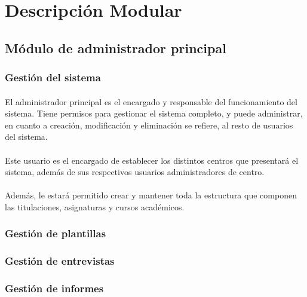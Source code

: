 \section{Descripción Modular}\label{descMod}

   \subsection{Módulo de administrador principal}

      \subsubsection{Gestión del sistema}

      \paragraph{}El administrador principal es el encargado y responsable
      del funcionamiento del sistema. Tiene permisos para gestionar el
      sistema completo, y puede administrar, en cuanto a creación, modificación
      y eliminación se refiere, al resto de usuarios del sistema.

      \paragraph{}Este usuario es el encargado de establecer los distintos
      centros que presentará el sistema, además de sus respectivos usuarios
      administradores de centro.

      \paragraph{}Además, le estará permitido crear y mantener toda la
      estructura que componen las titulaciones, asignaturas y cursos
      académicos.

      \subsubsection{Gestión de plantillas}

      \subsubsection{Gestión de entrevistas}

      \subsubsection{Gestión de informes}

